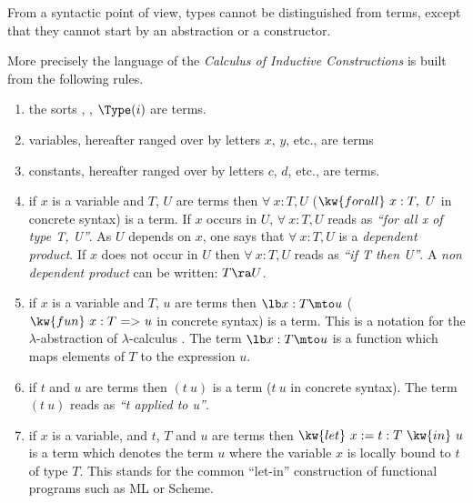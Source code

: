 From a syntactic point of view, types cannot be distinguished from terms,
except that they cannot start by an abstraction or a constructor.

More precisely the language of the {\em Calculus of Inductive
  Constructions} is built from the following rules.

\begin{enumerate}
\item the sorts {\Set}, {\Prop}, ${\Type(i)}$ are terms.
\item variables, hereafter ranged over by letters $x$, $y$, etc., are terms
\item constants, hereafter ranged over by letters $c$, $d$, etc.,  are terms.
\item{} if $x$ is a variable and $T$, $U$ are terms then $\forall~x:T,U$
  ($\kw{forall}~x:T,~U$ in \Coq{} concrete syntax) is a term. If $x$
  occurs in $U$, $\forall~x:T,U$ reads as {\it ``for all x of type T,
    U''}. As $U$ depends on $x$, one says that $\forall~x:T,U$ is a
  {\em dependent product}. If $x$ does not occur in $U$ then
  $\forall~x:T,U$ reads as {\it ``if T then U''}. A {\em non dependent
  product} can be written: $T \ra U$.
\item if $x$ is a variable and $T$, $u$ are terms then $\lb x:T \mto u$
  ($\kw{fun}~x:T~ {\tt =>}~ u$ in \Coq{} concrete syntax) is a term. This is a
  notation for the $\lambda$-abstraction of
  $\lambda$-calculus
  \cite{Bar81}. The term $\lb x:T \mto u$ is a function which maps
  elements of $T$ to the expression $u$.
\item if $t$ and $u$ are terms then $(t\ u)$ is a term  
 ($t~u$ in \Coq{} concrete syntax).  The term $(t\ 
  u)$ reads as {\it ``t applied to u''}.
\item if $x$ is a variable, and $t$, $T$ and $u$ are terms then
  $\kw{let}~x:=t:T~\kw{in}~u$ is a
  term which denotes the term $u$ where the variable $x$ is locally
  bound to $t$ of type $T$. This stands for the common ``let-in''
  construction of functional programs such as ML or Scheme.
\end{enumerate}

